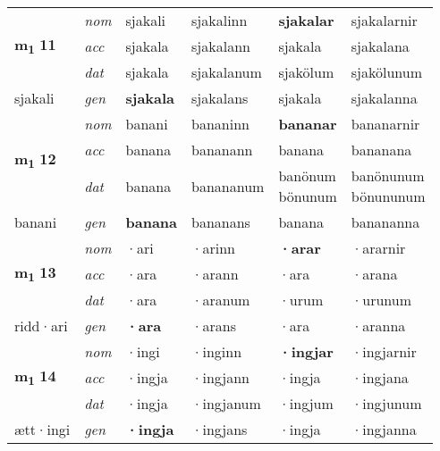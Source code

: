 \begin{longtable}[l]{X>{\footnotesize\itshape}XXXXX}
\multirow{3}{*}{{{\textbf{m{\textsubscript{1}}} \Large{\textbf{11}}}}} & nom & sjakali & sjakalinn & \textbf{sjakalar} & sjakalarnir \\*
 & acc & sjakala & sjakalann & sjakala & sjakalana \\*
 & dat & sjakala & sjakalanum & sjakölum & sjakölunum \\*
 {\footnotesize{sjakali}} & gen & \textbf{sjakala} & sjakalans & sjakala & sjakalanna \\
\midrule

\multirow{3}{*}{{{\textbf{m{\textsubscript{1}}} \Large{\textbf{12}}}}} & nom & banani & bananinn & \textbf{bananar} & bananarnir \\*
 & acc & banana & bananann & banana & bananana \\*
 & dat & banana & banananum & \specialcell{banönum\\ bönunum} & \specialcell{banönunum\\ bönununum} \\*
 {\footnotesize{banani}} & gen & \textbf{banana} & bananans & banana & banananna \\
\midrule

\multirow{3}{*}{{{\textbf{m{\textsubscript{1}}} \Large{\textbf{13}}}}} & nom & ·ari & ·arinn & \textbf{·arar} & ·ararnir \\*
 & acc & ·ara & ·arann & ·ara & ·arana \\*
 & dat & ·ara & ·aranum & ·urum & ·urunum \\*
 {\footnotesize{ridd\allowbreak ·ari}} & gen & \textbf{·ara} & ·arans & ·ara & ·aranna \\
\midrule

\multirow{3}{*}{{{\textbf{m{\textsubscript{1}}} \Large{\textbf{14}}}}} & nom & ·ingi & ·inginn & \textbf{·ingjar} & ·ingjarnir \\*
 & acc & ·ingja & ·ingjann & ·ingja & ·ingjana \\*
 & dat & ·ingja & ·ingjanum & ·ingjum & ·ingjunum \\*
 {\footnotesize{ætt\allowbreak ·ingi}} & gen & \textbf{·ingja} & ·ingjans & ·ingja & ·ingjanna \\
\midrule


\end{longtable}
